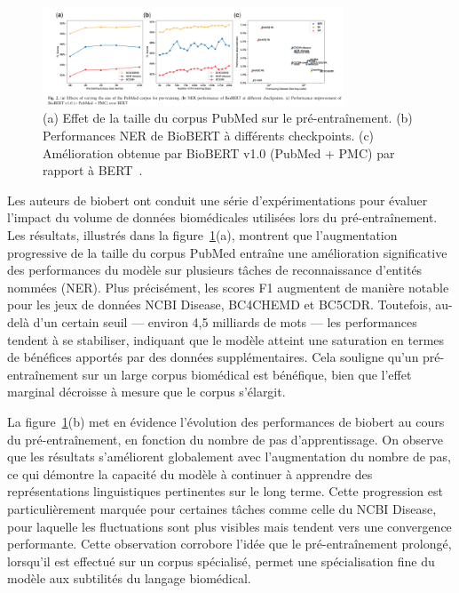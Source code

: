 \documentclass[12pt]{report}
\begin{document}
\begin{figure}[H]
    \centering
    \includegraphics[width=0.8\textwidth]{result_biobert.png}
    \caption{(a) Effet de la taille du corpus PubMed sur le pré-entraînement. (b) Performances NER de BioBERT à différents checkpoints. (c) Amélioration obtenue par BioBERT v1.0 (PubMed + PMC) par rapport à BERT~\cite{lee2020biobert}.}
    \label{fig:biobert_results}
\end{figure}

Les auteurs de \gls{biobert} ont conduit une série d'expérimentations pour évaluer l'impact du volume de données biomédicales utilisées lors du pré-entraînement. Les résultats, illustrés dans la figure~\ref{fig:biobert_results}(a), montrent que l’augmentation progressive de la taille du corpus PubMed entraîne une amélioration significative des performances du modèle sur plusieurs tâches de reconnaissance d’entités nommées (NER). Plus précisément, les scores F1 augmentent de manière notable pour les jeux de données NCBI Disease, BC4CHEMD et BC5CDR. Toutefois, au-delà d’un certain seuil — environ 4,5 milliards de mots — les performances tendent à se stabiliser, indiquant que le modèle atteint une saturation en termes de bénéfices apportés par des données supplémentaires. Cela souligne qu’un pré-entraînement sur un large corpus biomédical est bénéfique, bien que l’effet marginal décroisse à mesure que le corpus s’élargit.

La figure~\ref{fig:biobert_results}(b) met en évidence l’évolution des performances de \gls{biobert} au cours du pré-entraînement, en fonction du nombre de pas d’apprentissage. On observe que les résultats s’améliorent globalement avec l’augmentation du nombre de pas, ce qui démontre la capacité du modèle à continuer à apprendre des représentations linguistiques pertinentes sur le long terme. Cette progression est particulièrement marquée pour certaines tâches comme celle du NCBI Disease, pour laquelle les fluctuations sont plus visibles mais tendent vers une convergence performante. Cette observation corrobore l'idée que le pré-entraînement prolongé, lorsqu’il est effectué sur un corpus spécialisé, permet une spécialisation fine du modèle aux subtilités du langage biomédical.
\end{document}
